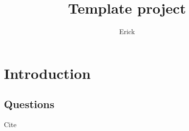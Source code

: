 \documentclass{article}
\title{Template project}
\author{Erick}
\begin{document}
\maketitle

\section*{Introduction}


\subsection*{Questions}

Cite \cite{Felsenstein1981-zs}



\end{document}
